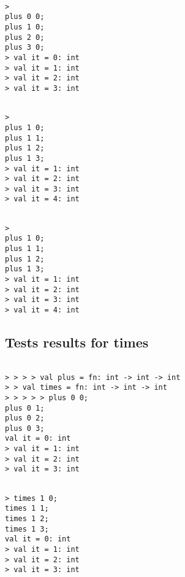 \documentclass{report}
\begin{document}
\begin{session}
  \begin{scriptsize}
\begin{verbatim}

> 
plus 0 0;
plus 1 0;
plus 2 0;
plus 3 0;
> val it = 0: int
> val it = 1: int
> val it = 2: int
> val it = 3: int
\end{verbatim}
  \end{scriptsize}
\end{session}

\begin{session}
  \begin{scriptsize}
\begin{verbatim}

> 
plus 1 0;
plus 1 1;
plus 1 2;
plus 1 3;
> val it = 1: int
> val it = 2: int
> val it = 3: int
> val it = 4: int
\end{verbatim}
  \end{scriptsize}
\end{session}

\begin{session}
  \begin{scriptsize}
\begin{verbatim}

> 
plus 1 0;
plus 1 1;
plus 1 2;
plus 1 3;
> val it = 1: int
> val it = 2: int
> val it = 3: int
> val it = 4: int
\end{verbatim}
  \end{scriptsize}
\end{session}

\subsection{Tests results for times}
\label{sec:tests-times}

\begin{session}
  \begin{scriptsize}
\begin{verbatim}

> > > > val plus = fn: int -> int -> int
> > val times = fn: int -> int -> int
> > > > > plus 0 0;
plus 0 1;
plus 0 2;
plus 0 3;
val it = 0: int
> val it = 1: int
> val it = 2: int
> val it = 3: int
\end{verbatim}
  \end{scriptsize}
\end{session}

\begin{session}
  \begin{scriptsize}
\begin{verbatim}

> times 1 0;
times 1 1;
times 1 2;
times 1 3;
val it = 0: int
> val it = 1: int
> val it = 2: int
> val it = 3: int
\end{verbatim}
  \end{scriptsize}
\end{session}
\end{document}

